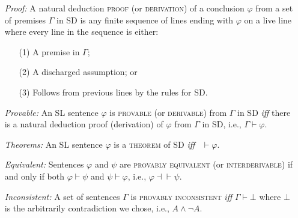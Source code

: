 \documentclass[a4paper, 11pt]{article} %
\begin{document}
\begin{enumerate}
  \item[\it Proof:] A natural deduction \textsc{proof} (or \textsc{derivation}) of a conclusion $\varphi$ from a set of premises $\Gamma$ in SD is any finite sequence of lines ending with $\varphi$ on a live line where every line in the sequence is either:
      \begin{itemize}
        \item[(1)] A premise in $\Gamma$; 
        \item[(2)] A discharged assumption; or
        \item[(3)] Follows from previous lines by the rules for SD.
      \end{itemize}
  \item[\it Provable:] An SL sentence $\varphi$ is \textsc{provable} (or \textsc{derivable}) from $\Gamma$ in SD \textit{iff} there is a natural deduction proof (derivation) of $\varphi$ from $\Gamma$ in SD, i.e., $\Gamma \vdash \varphi$. 
  \item[\it Theorems:] An SL sentence $\varphi$ is a \textsc{theorem} of SD \textit{iff}~ $\vdash\varphi$.
  \item[\it Equivalent:] Sentences $\varphi$ and $\psi$ are \textsc{provably equivalent} (or \textsc{interderivable}) if and only if both $\varphi\vdash\psi$ and $\psi\vdash\varphi$, i.e., $\varphi\dashv\vdash\psi$.
  \item[\it Inconsistent:] A set of sentences $\Gamma$ is \textsc{provably inconsistent} \textit{iff} $\Gamma\vdash\bot$ where $\bot$ is the arbitrarily contradiction we chose, i.e., $A\wedge\neg A$.
\end{enumerate}



%
%
\end{document}
